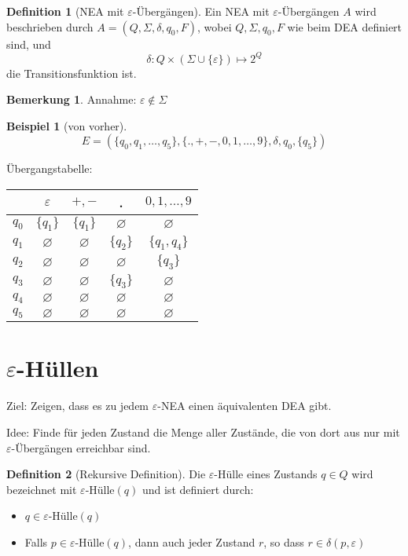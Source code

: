 \documentclass[11pt]{article} %
\theoremstyle{definition}
\newtheorem*{beispiel}{Beispiel}
\newtheorem{definition}{Definition}
\newtheorem*{bemerkung}{Bemerkung}
\begin{document}
\begin{definition}[NEA mit $\varepsilon$-Übergängen]
Ein NEA mit $\varepsilon$-Übergängen $A$ wird beschrieben durch $A = (Q, \Sigma, \delta, q_0, F)$, wobei $Q, \Sigma, q_0, F$ wie beim DEA definiert sind, und
\[
\delta: Q \times (\Sigma \cup \{\varepsilon\}) \mapsto 2^Q
\]
die Transitionsfunktion ist.
\end{definition}
\begin{bemerkung}
Annahme: $\varepsilon \notin \Sigma$
\end{bemerkung}

\begin{beispiel}[von vorher]
\[
E = (\{q_0, q_1, \dots, q_5\}, \{., +, -, 0, 1, \dots, 9 \}, \delta, q_0, \{q_5\})
\]

Übergangstabelle:

\begin{tabular}{r|c|c|c|c|}
& $\varepsilon$ & $+,-$ & . & $0,1,\dots,9$ \\\hline
$q_0$ & $\{q_1\}$& $\{q_1\}$& $\varnothing$& $\varnothing$ \\
$q_1$ & $\varnothing$& $\varnothing$& $\{q_2\}$& $\{q_1,q_4\}$ \\
$q_2$ &  $\varnothing$& $\varnothing$& $\varnothing$& $\{q_3\}$ \\
$q_3$ &  $\varnothing$& $\varnothing$& $\{q_3\}$& $\varnothing$ \\
$q_4$ & $\varnothing$& $\varnothing$& $\varnothing$ & $\varnothing$\\
$q_5$ & $\varnothing$& $\varnothing$& $\varnothing$ & $\varnothing$\\
\end{tabular}
\end{beispiel}

\section{$\varepsilon$-Hüllen}

Ziel: Zeigen, dass es zu jedem $\varepsilon$-NEA einen äquivalenten DEA gibt.

Idee: Finde für jeden Zustand die Menge aller Zustände, die von dort aus nur mit $\varepsilon$-Übergängen erreichbar sind.

\begin{definition}[Rekursive Definition]
Die $\varepsilon$-Hülle eines Zustands $q\in Q$ wird bezeichnet mit $\varepsilon$-Hülle$(q)$ und ist definiert durch: \begin{itemize}
\item $q \in \varepsilon$-Hülle$(q)$
\item Falls $p \in \varepsilon$-Hülle$(q)$, dann auch jeder Zustand $r$, so dass $r \in \delta(p, \varepsilon)$
\end{itemize}
\end{definition}
\end{document}
